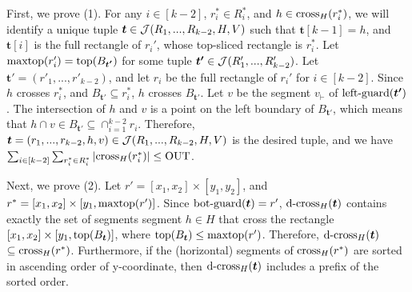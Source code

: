 First, we prove (1). For any $i \in [k-2]$, $r_i^*\in R_i^*$, and $h \in \mathrm{cross}_H(r_i^*)$, we will identify a unique tuple $\textrm{\boldmath${t}$} \in \mathcal{J}(R_1,...,R_{k-2},H,V)$ such that $\bm{t}[k-1] = h$, and $\bm{t}[i]$ is the full rectangle of $r_i'$, whose top-sliced rectangle is $r_i^*$. Let $\mathrm{maxtop}(r_i') = \mathrm{top}(B_{\textrm{\boldmath${t'}$}})$ for some tuple $\textrm{\boldmath${t'}$} \in \mathcal{J}(R_1',...,R_{k-2}')$. Let $\bm{t'} = (r'_1,...,r'_{k-2})$, and let $r_i$ be the full rectangle of $r_i'$ for $i \in [k-2]$. Since $h$ crosses $r_i^*$, and $B_\bm{t'} \subseteq r_i^*$, $h$ crosses $B_{\bm{t'}}$. Let $v$ be the segment $v_\vdash$ of $\mathrm{left\text{-}guard}(\textrm{\boldmath${t'}$})$. The intersection of $h$ and $v$ is a point on the left boundary of $B_{\bm{t'}}$, which means that $h\cap v \in B_{\bm{t'}} \subseteq \cap_{i = 1}^{k-2}r_i$. Therefore, $\textrm{\boldmath${t}$} = (r_1,...,r_{k-2},h,v)\in \mathcal{J}(R_1,...,R_{k-2},H,V)$ is the desired tuple, and we have $\sum_{i \in [k-2]}\sum_{r_i^*\in R_i^*} |\mathrm{cross}_H(r_i^*)| \leq \mathrm{OUT}$.

Next, we prove (2). Let $r' = [x_1,x_2]\times [y_1,y_2]$, and $r^* = [x_1,x_2] \times [y_1,\mathrm{maxtop}(r')]$. Since $\mathrm{bot\text{-}guard}(\textrm{\boldmath${t}$}) = r'$, $\mathrm{d\text{-}cross}_H(\textrm{\boldmath${t}$})$ contains exactly the set of segments segment $h \in H$ that cross the rectangle $[x_1,x_2]\times [y_1, \mathrm{top}(B_{\textrm{\boldmath${t}$}})]$, where $\mathrm{top}(B_{\textrm{\boldmath${t}$}})\leq \mathrm{maxtop}(r')$. Therefore, $\mathrm{d\text{-}cross}_H(\textrm{\boldmath${t}$})$ $\subseteq \mathrm{cross}_H(r^*)$. Furthermore, if the (horizontal) segments of $\mathrm{cross}_H(r^*)$ are sorted in ascending order of y-coordinate, then $\mathrm{d\text{-}cross}_H(\textrm{\boldmath${t}$})$ includes a prefix of the sorted order.